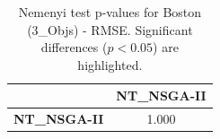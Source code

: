 \begin{table}[h!]
\centering
\scriptsize
\begin{tabular}{lc}
\toprule
 & NT\_NSGA-II \\
\midrule
\textbf{NT\_NSGA-II} & 1.000 \\
\bottomrule
\end{tabular}
\caption{Nemenyi test p-values for Boston (3_Objs) - RMSE. Significant differences ($p < 0.05$) are highlighted.}
\label{tab:nemenyi_nemenyi_Boston_3_Objs_Test_RMSE}
\end{table}